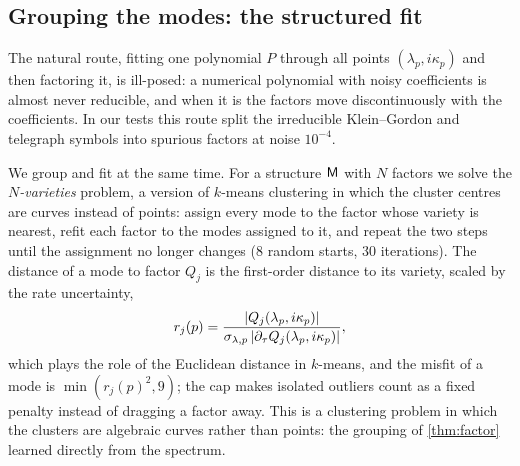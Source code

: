 \subsection{Grouping the modes: the structured fit}\label{sec:alg-structfit}
The natural route, fitting one polynomial $P$ through all points $(\lambda_p,i\kappa_p)$ and then factoring
it, is ill-posed: a numerical polynomial with noisy coefficients is almost never reducible, and when it is
the factors move discontinuously with the coefficients. In our tests this route split the irreducible
Klein--Gordon and telegraph symbols into spurious factors at noise $10^{-4}$.

We group and fit at the same time. For a structure $\mathsf{M}$ with $N$ factors we solve the
\emph{$N$-varieties} problem, a version of $k$-means clustering in which the cluster centres are curves instead of
points: assign every mode to the factor whose variety is nearest, refit each factor to the modes assigned to it, and
repeat the two steps until the assignment no longer changes (8 random starts, 30 iterations). The distance of a mode to factor $Q_j$ is
the first-order distance to its variety, scaled by the rate uncertainty,
\begin{equation}\label{eq:vardist}
  r_j(p)=\frac{\lvert Q_j(\lambda_p,i\kappa_p)\rvert}{\sigma_{\lambda,p}\,\lvert\partial_\tau Q_j(\lambda_p,i\kappa_p)\rvert},
\end{equation}
which plays the role of the Euclidean distance in $k$-means, and the misfit of a mode is $\min(r_j(p)^2,9)$; the cap makes isolated outliers count as a fixed
penalty instead of dragging a factor away. This is a clustering problem in which the clusters are
algebraic curves rather than points: the grouping of \cref{thm:factor} learned directly from the
spectrum.
